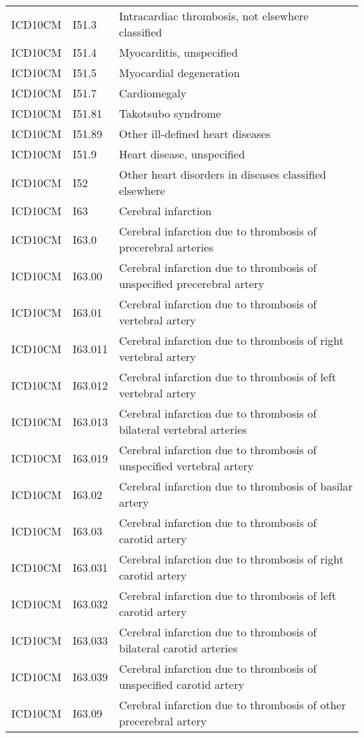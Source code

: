 \begin{longtable}{p{}p{}p{}}
  ICD10CM & I51.3 & Intracardiac thrombosis, not elsewhere classified \\ 
  ICD10CM & I51.4 & Myocarditis, unspecified \\ 
  ICD10CM & I51.5 & Myocardial degeneration \\ 
  ICD10CM & I51.7 & Cardiomegaly \\ 
  ICD10CM & I51.81 & Takotsubo syndrome \\ 
  ICD10CM & I51.89 & Other ill-defined heart diseases \\ 
  ICD10CM & I51.9 & Heart disease, unspecified \\ 
  ICD10CM & I52 & Other heart disorders in diseases classified elsewhere \\ 
  ICD10CM & I63 & Cerebral infarction \\ 
  ICD10CM & I63.0 & Cerebral infarction due to thrombosis of precerebral arteries \\ 
  ICD10CM & I63.00 & Cerebral infarction due to thrombosis of unspecified precerebral artery \\ 
  ICD10CM & I63.01 & Cerebral infarction due to thrombosis of vertebral artery \\ 
  ICD10CM & I63.011 & Cerebral infarction due to thrombosis of right vertebral artery \\ 
  ICD10CM & I63.012 & Cerebral infarction due to thrombosis of left vertebral artery \\ 
  ICD10CM & I63.013 & Cerebral infarction due to thrombosis of bilateral vertebral arteries \\ 
  ICD10CM & I63.019 & Cerebral infarction due to thrombosis of unspecified vertebral artery \\ 
  ICD10CM & I63.02 & Cerebral infarction due to thrombosis of basilar artery \\ 
  ICD10CM & I63.03 & Cerebral infarction due to thrombosis of carotid artery \\ 
  ICD10CM & I63.031 & Cerebral infarction due to thrombosis of right carotid artery \\ 
  ICD10CM & I63.032 & Cerebral infarction due to thrombosis of left carotid artery \\ 
  ICD10CM & I63.033 & Cerebral infarction due to thrombosis of bilateral carotid arteries \\ 
  ICD10CM & I63.039 & Cerebral infarction due to thrombosis of unspecified carotid artery \\ 
  ICD10CM & I63.09 & Cerebral infarction due to thrombosis of other precerebral artery \\ 

\end{longtable}
